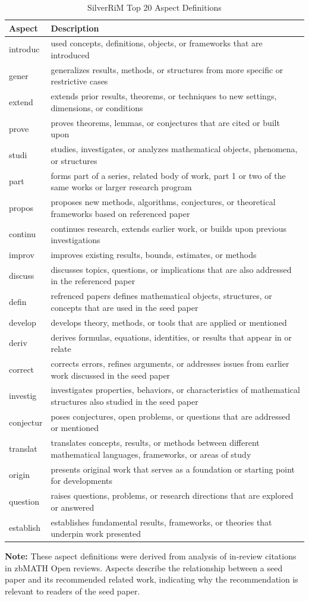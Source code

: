 \documentclass[sigconf,anonymous]{acmart}
\begin{document}
\begin{table}[h]
\centering
\caption{SilverRiM Top 20 Aspect Definitions}
\label{tab:silverrim_aspects}
\small
\begin{tabular}{p{2.5cm}p{12cm}}
\hline
\textbf{Aspect} & \textbf{Description} \\
\hline
introduc & used concepts, definitions, objects, or frameworks that are introduced \\
\hline
gener & generalizes results, methods, or structures from more specific or restrictive cases \\
\hline
extend & extends prior results, theorems, or techniques to new settings, dimensions, or conditions \\
\hline
prove & proves theorems, lemmas, or conjectures that are cited or built upon \\
\hline
studi & studies, investigates, or analyzes mathematical objects, phenomena, or structures \\
\hline
part & forms part of a series, related body of work, part 1 or two of the same works or larger research program \\
\hline
propos & proposes new methods, algorithms, conjectures, or theoretical frameworks based on referenced paper \\
\hline
continu & continues research, extends earlier work, or builds upon previous investigations \\
\hline
improv & improves existing results, bounds, estimates, or methods \\
\hline
discuss & discusses topics, questions, or implications that are also addressed in the referenced paper \\
\hline
defin & refrenced papers defines mathematical objects, structures, or concepts that are used in the seed paper \\
\hline
develop & develops theory, methods, or tools that are applied or mentioned \\
\hline
deriv & derives formulas, equations, identities, or results that appear in or relate \\
\hline
correct & corrects errors, refines arguments, or addresses issues from earlier work discussed in the seed paper \\
\hline
investig & investigates properties, behaviors, or characteristics of mathematical structures also studied in the seed paper \\
\hline
conjectur & poses conjectures, open problems, or questions that are addressed or mentioned \\
\hline
translat & translates concepts, results, or methods between different mathematical languages, frameworks, or areas of study \\
\hline
origin & presents original work that serves as a foundation or starting point for developments \\
\hline
question & raises questions, problems, or research directions that are explored or answered \\
\hline
establish & establishes fundamental results, frameworks, or theories that underpin work presented \\
\hline
\end{tabular}
\end{table}

\noindent \textbf{Note:} These aspect definitions were derived from analysis of in-review citations in zbMATH Open reviews. Aspects describe the relationship between a seed paper and its recommended related work, indicating why the recommendation is relevant to readers of the seed paper.
\end{document}
